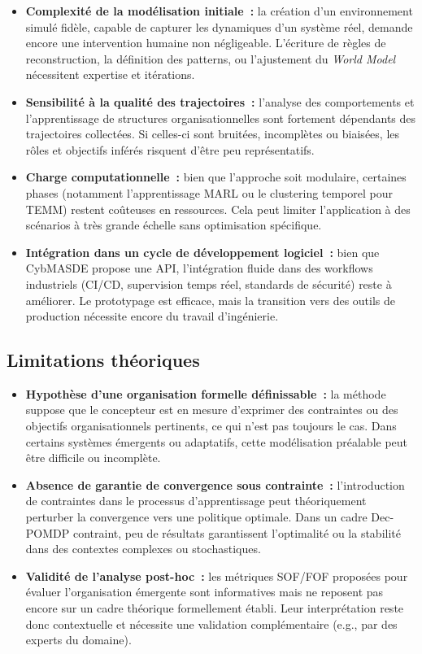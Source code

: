 \begin{itemize}
    \item \textbf{Complexité de la modélisation initiale~:} la création d’un environnement simulé fidèle, capable de capturer les dynamiques d’un système réel, demande encore une intervention humaine non négligeable. L’écriture de règles de reconstruction, la définition des patterns, ou l’ajustement du \textit{World Model} nécessitent expertise et itérations.

    \item \textbf{Sensibilité à la qualité des trajectoires~:} l’analyse des comportements et l’apprentissage de structures organisationnelles sont fortement dépendants des trajectoires collectées. Si celles-ci sont bruitées, incomplètes ou biaisées, les rôles et objectifs inférés risquent d’être peu représentatifs.

    \item \textbf{Charge computationnelle~:} bien que l’approche soit modulaire, certaines phases (notamment l’apprentissage MARL ou le clustering temporel pour TEMM) restent coûteuses en ressources. Cela peut limiter l’application à des scénarios à très grande échelle sans optimisation spécifique.

    \item \textbf{Intégration dans un cycle de développement logiciel~:} bien que CybMASDE propose une API, l’intégration fluide dans des workflows industriels (CI/CD, supervision temps réel, standards de sécurité) reste à améliorer. Le prototypage est efficace, mais la transition vers des outils de production nécessite encore du travail d’ingénierie.
\end{itemize}

\subsection*{Limitations théoriques}

\begin{itemize}
    \item \textbf{Hypothèse d’une organisation formelle définissable~:} la méthode suppose que le concepteur est en mesure d’exprimer des contraintes ou des objectifs organisationnels pertinents, ce qui n’est pas toujours le cas. Dans certains systèmes émergents ou adaptatifs, cette modélisation préalable peut être difficile ou incomplète.

    \item \textbf{Absence de garantie de convergence sous contrainte~:} l’introduction de contraintes dans le processus d’apprentissage peut théoriquement perturber la convergence vers une politique optimale. Dans un cadre Dec-POMDP contraint, peu de résultats garantissent l’optimalité ou la stabilité dans des contextes complexes ou stochastiques.

    \item \textbf{Validité de l’analyse post-hoc~:} les métriques SOF/FOF proposées pour évaluer l’organisation émergente sont informatives mais ne reposent pas encore sur un cadre théorique formellement établi. Leur interprétation reste donc contextuelle et nécessite une validation complémentaire (e.g., par des experts du domaine).
\end{itemize}

